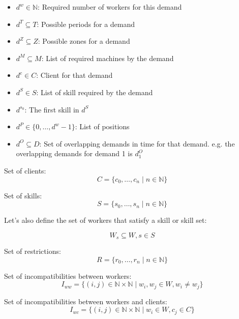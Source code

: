 \documentclass[../thesis.tex]{subfiles}
\begin{document}
\begin{itemize}
    \item $d^w \in \mathbb{N}$: Required number of workers for this demand
    \item $d^T \subseteq T$: Possible periods for a demand
    \item $d^Z \subseteq Z$: Possible zones for a demand
    \item $d^M \subseteq M$: List of required machines by the demand
    \item $d^c \in C$: Client for that demand
    \item $d^S \in S$: List of skill required by the demand
    \item $d^{s_0}$: The first skill in $d^S$
    \item $d^P \in \{ 0, \dots, d^w - 1 \}$: List of positions
    \item $d^O \subseteq D$: Set of overlapping demands in time for that demand. e.g. the overlapping demands for demand 1 is $d_1^O$
\end{itemize}
Set of clients: 
\begin{equation*}
    C = \{ c_0, \dots, c_n \mid n \in \mathbb{N} \}
\end{equation*}

Set of skills: 
\begin{equation*}
    S = \{ s_0, \dots, s_n \mid n \in \mathbb{N} \}
\end{equation*}

Let's also define the set of workers that satisfy a skill or skill set:

\begin{equation*}
    W_s \subseteq W, s \in S
\end{equation*}




Set of restrictions: 
\begin{equation*}
    R = \{ r_0, \dots, r_n \mid n \in \mathbb{N} \}
\end{equation*}


Set of incompatibilities between workers:
\begin{equation*}
    {I_{ww} = \{ ({i},{j}) \in \mathbb{N} \times \mathbb{N} \mid w_i, w_j \in W, w_i \neq w_j \}}
\end{equation*}

Set of incompatibilities between workers and clients:
\begin{equation*}
    I_{wc} = \{ (i, j) \in \mathbb{N} \times \mathbb{N} \mid w_i \in W, c_j \in C \}
\end{equation*}
\end{document}

